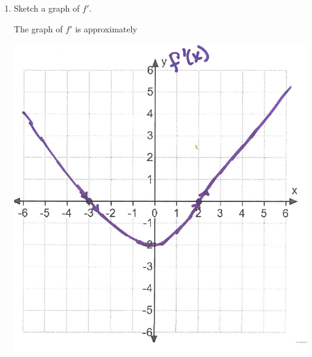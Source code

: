 \documentclass[nooutcomes]{ximera}
\begin{document}
\begin{problem}
\begin{enumerate}
\begin{enumerate}
      \end{enumerate}
      \item
      Sketch a graph of $f'$.
      \begin{freeResponse}
        The graph of $f'$ is approximately
        \begin{image}
          \includegraphics[scale = 0.5]{Figure2.png}
        \end{image}
      \end{freeResponse}
  \end{enumerate}
\end{problem}
\end{document}
